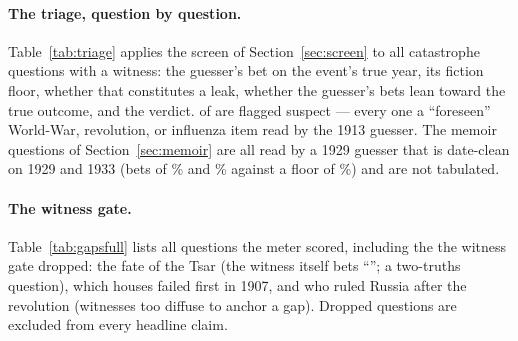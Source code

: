 \documentclass[11pt]{article}
\begin{document}
\begin{table}[h]\centering\small

\caption{The date-spike audit of both frozen readers, all test events, base models. Entries are spike
ratios; bold = above that reader's fiction ceiling for an event after its cutoff (a leak). Events before a
reader's cutoff are real knowledge and shown for scale.}
\label{tab:spike}
\end{table}

\paragraph{The triage, question by question.} Table~\ref{tab:triage} applies the screen of
Section~\ref{sec:screen} to all \NtriageItems{} catastrophe questions with a witness: the guesser's bet on
the event's true year, its fiction floor, whether that constitutes a leak, whether the guesser's bets lean
toward the true outcome, and the verdict. \NtriageSuspect{} of \NtriageItems{} are flagged suspect ---
every one a ``foreseen'' World-War, revolution, or influenza item read by the 1913 guesser. The memoir
questions of Section~\ref{sec:memoir} are all read by a 1929 guesser that is date-clean on 1929 and 1933
(bets of \NdateDep\% and \NdateNazi\% against a floor of \NfloorTwentyNine\%) and are not tabulated.

\begin{table}[h]\centering\small

\caption{The contamination triage of every catastrophe question with a witness. ``$P$(yr)'' is the
guesser's probability on the event's true year under its canonical dating prompt; ``floor'' is the 95th
percentile of the same quantity on invented events. A question is suspect iff the guesser leaks the date
AND leans to the true outcome; it is safe if the guesser is date-clean, or if it knows the event and still
bets on the wrong future (which leakage cannot produce).}
\label{tab:triage}
\end{table}

\paragraph{The witness gate.} Table~\ref{tab:gapsfull} lists all \NnCovered{} questions the meter scored,
including the \NgateDropped{} the witness gate dropped: the fate of the Tsar (the witness itself bets
``\NtsarWitnessBet''; a two-truths question), which houses failed first in 1907, and who ruled Russia
after the revolution (witnesses too diffuse to anchor a gap). Dropped questions are excluded from every
headline claim.
\end{document}
